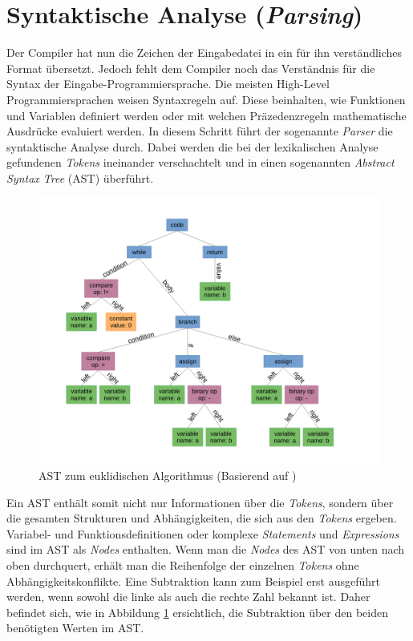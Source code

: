 \section{Syntaktische Analyse (\textit{Parsing})}
Der Compiler hat nun die Zeichen der Eingabedatei in ein für ihn verständliches Format übersetzt.
Jedoch fehlt dem Compiler noch das Verständnis für die Syntax der Eingabe-Programmiersprache.
Die meisten High-Level Programmiersprachen weisen Syntaxregeln auf. Diese beinhalten, wie Funktionen und Variablen definiert werden oder mit welchen Präzedenzregeln mathematische Ausdrücke evaluiert werden.
In diesem Schritt führt der sogenannte \textit{Parser} die syntaktische Analyse durch.
Dabei werden die bei der lexikalischen Analyse gefundenen \textit{Tokens} ineinander verschachtelt und in einen sogenannten \textit{Abstract Syntax Tree} (AST) überführt.

\begin{figure}[H]
    \centering
    \includegraphics[scale=0.4]{resources/images/AST.pdf}
    \caption{AST zum euklidischen Algorithmus (Basierend auf \cite{img:AST})}
    \label{fig:syntax-tree}
\end{figure}

Ein AST enthält somit nicht nur Informationen über die \textit{Tokens}, sondern über die gesamten Strukturen und Abhängigkeiten, die sich aus den \textit{Tokens} ergeben.
Variabel- und Funktionsdefinitionen oder komplexe \textit{Statements} und \textit{Expressions} sind im AST als \textit{Nodes} enthalten.
Wenn man die \textit{Nodes} des AST von unten nach oben durchquert, erhält man die Reihenfolge der einzelnen \textit{Tokens} ohne Abhängigkeitskonflikte.
Eine Subtraktion kann zum Beispiel erst ausgeführt werden, wenn sowohl die linke als auch die rechte Zahl bekannt ist.
Daher befindet sich, wie in Abbildung \ref{fig:syntax-tree} ersichtlich, die Subtraktion über den beiden benötigten Werten im AST.

